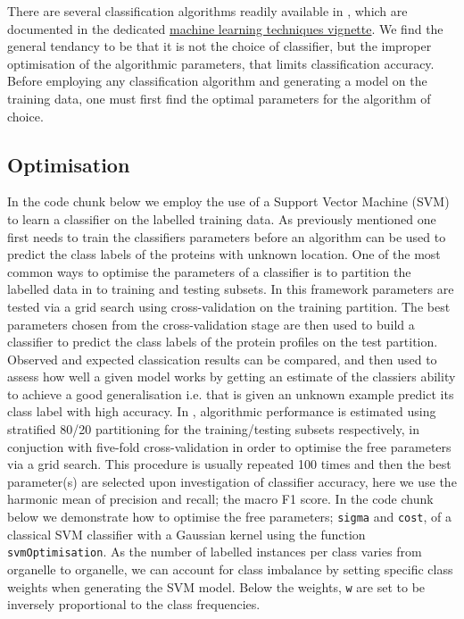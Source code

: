 There are several classification algorithms readily available in
, which are documented in the dedicated
\href{http://bioconductor.org/packages/release/bioc/vignettes/pRoloc/inst/doc/pRoloc-ml.pdf}{
  machine learning techniques vignette}.  We find the general tendancy
to be that it is not the choice of classifier, but the improper
optimisation of the algorithmic parameters, that limits classification
accuracy. Before employing any classification algorithm and generating
a model on the training data, one must first find the optimal
parameters for the algorithm of choice.

\subsection*{Optimisation}

In the code chunk below we employ the use of a Support Vector Machine
(SVM) to learn a classifier on the labelled training data. As
previously mentioned one first needs to train the classifiers
parameters before an algorithm can be used to predict the class labels
of the proteins with unknown location. One of the most common ways to
optimise the parameters of a classifier is to partition the labelled
data in to training and testing subsets. In this framework parameters
are tested via a grid search using cross-validation on the training
partition. The best parameters chosen from the cross-validation stage
are then used to build a classifier to predict the class labels of the
protein profiles on the test partition. Observed and expected
classication results can be compared, and then used to assess how well
a given model works by getting an estimate of the classiers ability to
achieve a good generalisation i.e. that is given an unknown example
predict its class label with high accuracy. In
, algorithmic performance is estimated using
stratified 80/20 partitioning for the training/testing subsets
respectively, in conjuction with five-fold cross-validation in order
to optimise the free parameters via a grid search. This procedure is
usually repeated 100 times and then the best parameter(s) are selected
upon investigation of classifier accuracy, here we use the harmonic
mean of precision and recall; the macro F1 score. In the code chunk
below we demonstrate how to optimise the free parameters; \texttt{sigma} and
\texttt{cost}, of a classical SVM classifier with a Gaussian kernel using the
function \texttt{svmOptimisation}. As the number of labelled instances per
class varies from organelle to organelle, we can account for class
imbalance by setting specific class weights when generating the SVM
model. Below the weights, \texttt{w} are set to be inversely proportional to
the class frequencies.




